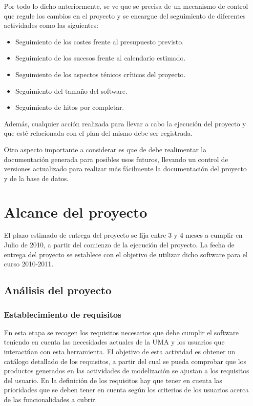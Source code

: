 \documentclass[11pt,a4paper,spanish,twoside]{report}
\begin{document}
Por todo lo dicho anteriormente, se ve que se precisa de un mecanismo de 
control que regule los cambios en el proyecto y se encargue del seguimiento de 
diferentes actividades como las siguientes:

\begin{itemize}
\item Seguimiento de los costes frente al presupuesto previsto.
\item Seguimiento de los sucesos frente al calendario estimado.
\item Seguimiento de los aspectos ténicos críticos del proyecto.
\item Seguimiento del tamaño del software.
\item Seguimiento de hitos por completar.
\end{itemize}

Además, cualquier acción realizada para llevar a cabo la ejecución del 
proyecto y que esté relacionada con el plan del mismo debe ser registrada.

Otro aspecto importante a considerar es que de debe realimentar la 
documentación generada para posibles usos futuros, llevando un control de 
versiones actualizado para realizar más fácilmente la documentación del 
proyecto y de la base de datos.

\chapter{Alcance del proyecto}
El plazo estimado de entrega del proyecto se fija entre 3 y 4 meses a cumplir
en Julio de 2010, a partir del comienzo de la ejecución del proyecto. La
fecha de entrega del proyecto se establece con el objetivo de utilizar dicho
software para el curso 2010-2011. 
\section{Análisis del proyecto}
\subsection{Establecimiento de requisitos}
En esta etapa se recogen los requisitos necesarios que debe cumplir el
software teniendo en cuenta las necesidades actuales de la UMA y los usuarios
que interactúan con esta herramienta. 
El objetivo de esta actividad es obtener un catálogo detallado de los
requisitos, a partir del cual se pueda comprobar que los productos generados
en las actividades de modelización se ajustan a los requisitos del usuario.
En la definición de los requisitos hay que tener en cuenta las prioridades
que se deben tener en cuenta según los criterios de los usuarios
acerca de las funcionalidades a cubrir. 
\end{document}
